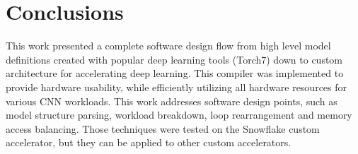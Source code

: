 \documentclass{sig-alternate}
\begin{document}


\section{Conclusions}
This work presented a complete software design flow from high level model definitions created with popular deep learning tools (Torch7) down to custom architecture for accelerating deep learning. This compiler was implemented to provide hardware usability, while efficiently utilizing all hardware resources for various CNN workloads. This work addresses software design points, such as model structure parsing, workload breakdown, loop rearrangement and memory access balancing. Those techniques were tested on the Snowflake custom accelerator, but they can be applied to other custom accelerators.


\end{document}
